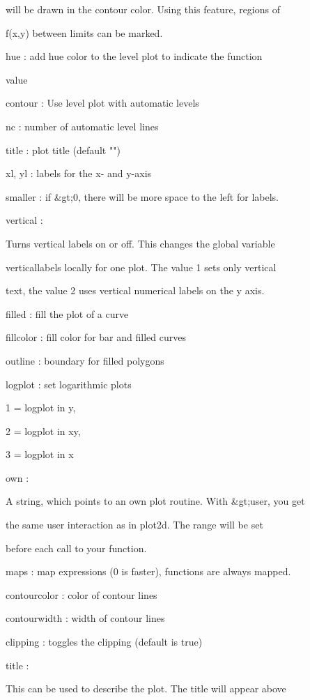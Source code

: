 \documentclass{article}
\begin{document}
will be drawn in the contour color. Using this feature, regions of


f(x,y) between limits can be marked.




hue       : add hue color to the level plot to indicate the function


            value


contour   : Use level plot with automatic levels


nc        : number of automatic level lines


title     : plot title (default "")


xl, yl    : labels for the x- and y-axis


smaller   : if &gt;0, there will be more space to the left for labels.


vertical  :


  Turns vertical labels on or off. This changes the global variable


  verticallabels locally for one plot. The value 1 sets only vertical


  text, the value 2 uses vertical numerical labels on the y axis.


filled    : fill the plot of a curve


fillcolor : fill color for bar and filled curves


outline   : boundary for filled polygons


logplot   : set logarithmic plots


            1 = logplot in y,


            2 = logplot in xy,


            3 = logplot in x


own       :


  A string, which points to an own plot routine. With &gt;user, you get


  the same user interaction as in plot2d. The range will be set


  before each call to your function.


maps      : map expressions (0 is faster), functions are always mapped.


contourcolor : color of contour lines


contourwidth : width of contour lines


clipping  : toggles the clipping (default is true)


title     :


  This can be used to describe the plot. The title will appear above
\end{document}
